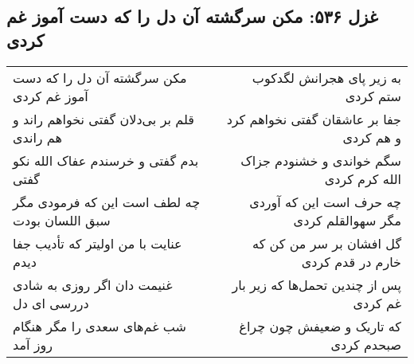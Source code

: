 \begin{center}
\section*{غزل ۵۳۶: مکن سرگشته آن دل را که دست آموز غم کردی}
\label{sec:536}
\begin{longtable}{l p{0.5cm} r}
مکن سرگشته آن دل را که دست آموز غم کردی
&&
به زیر پای هجرانش لگدکوب ستم کردی
\\
قلم بر بی‌دلان گفتی نخواهم راند و هم راندی
&&
جفا بر عاشقان گفتی نخواهم کرد و هم کردی
\\
بدم گفتی و خرسندم عفاک الله نکو گفتی
&&
سگم خواندی و خشنودم جزاک الله کرم کردی
\\
چه لطف است این که فرمودی مگر سبق اللسان بودت
&&
چه حرف است این که آوردی مگر سهوالقلم کردی
\\
عنایت با من اولیتر که تأدیب جفا دیدم
&&
گل افشان بر سر من کن که خارم در قدم کردی
\\
غنیمت دان اگر روزی به شادی دررسی ای دل
&&
پس از چندین تحمل‌ها که زیر بار غم کردی
\\
شب غم‌های سعدی را مگر هنگام روز آمد
&&
که تاریک و ضعیفش چون چراغ صبحدم کردی
\\
\end{longtable}
\end{center}
